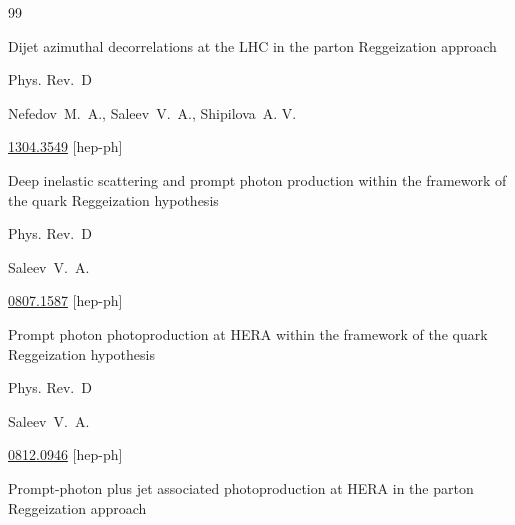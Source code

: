 \begin{thebibliography}{99}

\paper Dijet azimuthal decorrelations at the LHC in the parton Reggeization approach


\jour Phys. Rev.~D 



\by Nefedov~M.~A.,  Saleev~V.~A., Shipilova~A. V.



\arxiv \href{http://arxiv.org/abs/1304.3549}{1304.3549} [hep-ph]






\paper Deep inelastic scattering and prompt photon production within the framework of the quark Reggeization hypothesis


\jour Phys. Rev.~D 



\by Saleev~V.~A.



\arxiv \href{http://arxiv.org/abs/0807.1587}{0807.1587} [hep-ph]

  

  

  


\paper Prompt photon photoproduction at HERA within the framework of the quark Reggeization hypothesis


\jour Phys. Rev.~D 



\by Saleev~V.~A.



\arxiv \href{http://arxiv.org/abs/0812.0946}{0812.0946} [hep-ph]




\paper Prompt-photon plus jet associated photoproduction at HERA in the parton Reggeization approach


\end{thebibliography}
